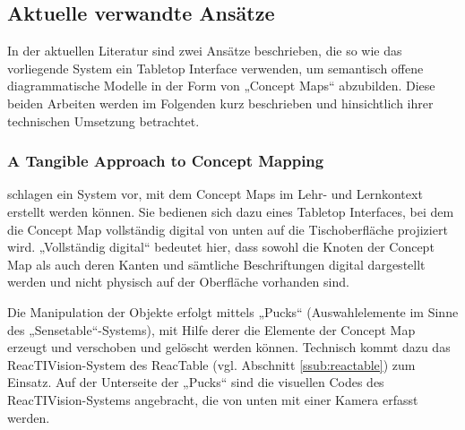 \subsection{Aktuelle verwandte Ansätze} %
\label{sub:aktuelle_verwandte_ansätze}

In der aktuellen Literatur sind zwei Ansätze beschrieben, die so wie das vorliegende System ein Tabletop Interface verwenden, um semantisch offene diagrammatische Modelle in der Form von „Concept Maps“ abzubilden. Diese beiden Arbeiten werden im Folgenden kurz beschrieben und hinsichtlich ihrer technischen Umsetzung betrachtet.

\subsubsection{A Tangible Approach to Concept Mapping} %
\label{ssub:a_tangible_approach_to_concept_mapping}

\citet{Tanenbaum09} schlagen ein System vor, mit dem Concept Maps im Lehr- und Lernkontext erstellt werden können. Sie bedienen sich dazu eines Tabletop Interfaces, bei dem die Concept Map vollständig digital von unten auf die Tischoberfläche projiziert wird. „Vollständig digital“ bedeutet hier, dass sowohl die Knoten der Concept Map als auch deren Kanten und sämtliche Beschriftungen digital dargestellt werden und nicht physisch auf der Oberfläche vorhanden sind.

Die Manipulation der Objekte erfolgt mittels „Pucks“ (Auswahlelemente im Sinne des „Sensetable“-Systems), mit Hilfe derer die Elemente der Concept Map erzeugt und verschoben und gelöscht werden können. Technisch kommt dazu das ReacTIVision-System des ReacTable (vgl. Abschnitt \ref{ssub:reactable}) zum Einsatz. Auf der Unterseite der „Pucks“ sind die visuellen Codes des ReacTIVision-Systems angebracht, die von unten mit einer Kamera erfasst werden.

